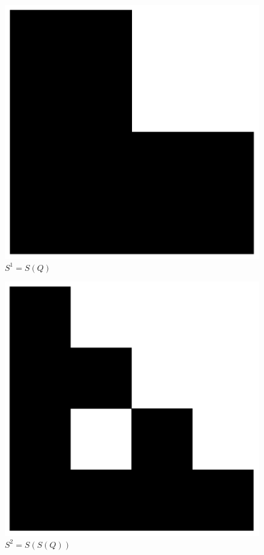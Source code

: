 \documentclass{beamer}
\begin{document}
\begin{frame}
    \begin{figure}
        \centering
        \includegraphics[scale=0.5]{1.pdf}
        \caption{$S^1 = S(Q)$}
    \end{figure}
\end{frame}

\begin{frame}
    \begin{figure}
        \centering
        \includegraphics[scale=0.5]{2.pdf}
        \caption{$S^2 = S(S(Q))$}
    \end{figure}
\end{frame}
\end{document}
